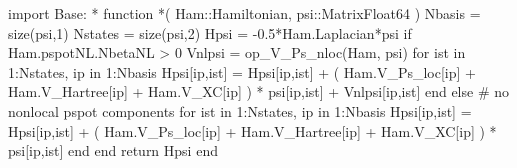 \begin{juliacode}
import Base: *
function *( Ham::Hamiltonian, psi::Matrix{Float64} )
  Nbasis = size(psi,1)
  Nstates = size(psi,2)
  Hpsi = -0.5*Ham.Laplacian*psi
  if Ham.pspotNL.NbetaNL > 0
    Vnlpsi = op_V_Ps_nloc(Ham, psi)
    for ist in 1:Nstates, ip in 1:Nbasis
        Hpsi[ip,ist] = Hpsi[ip,ist] + ( Ham.V_Ps_loc[ip] +
            Ham.V_Hartree[ip] + Ham.V_XC[ip] ) * psi[ip,ist] + Vnlpsi[ip,ist]
    end
  else # no nonlocal pspot components
    for ist in 1:Nstates, ip in 1:Nbasis
            Hpsi[ip,ist] = Hpsi[ip,ist] + ( Ham.V_Ps_loc[ip] +
                Ham.V_Hartree[ip] + Ham.V_XC[ip] ) * psi[ip,ist]
    end
  end
  return Hpsi
end
\end{juliacode}